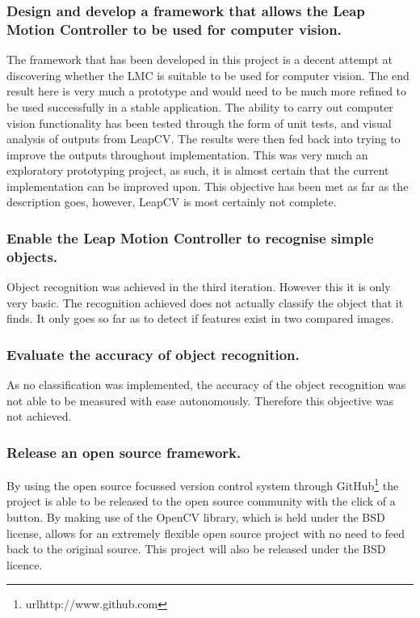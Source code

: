\documentclass[11pt,oneside]{report}
\begin{document}
		\subsubsection{Design and develop a framework that allows the Leap Motion Controller to be used for computer vision.}
		The framework that has been developed in this project is a decent attempt at discovering whether the LMC is suitable to be used for computer vision.
		The end result here is very much a prototype and would need to be much more refined to be used successfully in a stable application.
		The ability to carry out computer vision functionality has been tested through the form of unit tests, and visual analysis of outputs from LeapCV.
		The results were then fed back into trying to improve the outputs throughout implementation.
		This was very much an exploratory prototyping project, as such, it is almost certain that the current implementation can be improved upon.
		This objective has been met as far as the description goes, however, LeapCV is most certainly not complete.
		\subsubsection{Enable the Leap Motion Controller to recognise simple objects.}
		Object recognition was achieved in the third iteration.
		However this it is only very basic.
		The recognition achieved does not actually classify the object that it finds.
		It only goes so far as to detect if features exist in two compared images.
		\subsubsection{Evaluate the accuracy of object recognition.}
		As no classification was implemented, the accuracy of the object recognition was not able to be measured with ease autonomously.
		Therefore this objective was not achieved.
		\subsubsection{Release an open source framework.}
		By using the open source focussed version control system through GitHub\footnote{url{http://www.github.com}} the project is able to be released to the open source community with the click of a button.
		By making use of the OpenCV library, which is held under the BSD license, allows for an extremely flexible open source project with no need to feed back to the original source.
		This project will also be released under the BSD licence.
\end{document}
